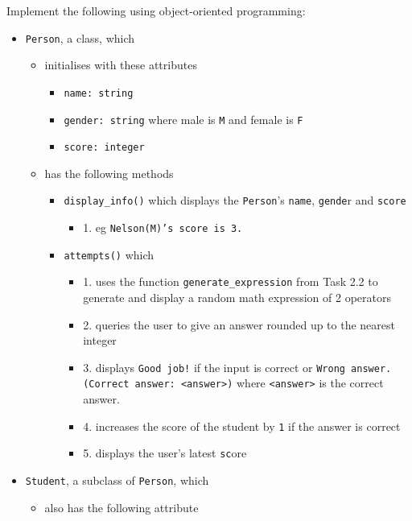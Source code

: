 Implement the following using object-oriented programming: 
\begin{itemize}
\item \texttt{Person}, a class, which 
\begin{itemize}
\item initialises with these attributes 
\begin{itemize}
\item \texttt{name: string }
\item \texttt{gender: string} where male is \textquotedbl\texttt{M}\textquotedbl{}
and female is \textquotedbl\texttt{F}\textquotedbl{} 
\item \texttt{score: integer }
\end{itemize}
\item has the following methods 
\begin{itemize}
\item \texttt{display\_info()} which displays the \texttt{Person}\textquoteright s
\texttt{name}, \texttt{gende}r and \texttt{score} 
\begin{itemize}
\item 1. eg \textquotedbl\texttt{Nelson(M)\textquoteright s score is 3.}\textquotedbl{} 
\end{itemize}
\item \texttt{attempts()} which
\begin{itemize}
\item 1. uses the function \texttt{generate\_expression} from Task 2.2 to
generate and display a random math expression of 2 operators 
\item 2. queries the user to give an answer rounded up to the nearest integer 
\item 3. displays \textquotedbl\texttt{Good job!}\textquotedbl{} if the
input is correct or \textquotedbl\texttt{Wrong answer. (Correct
answer: <answer>)}\textquotedbl{} where \texttt{<answer>} is the correct
answer. 
\item 4. increases the score of the student by \texttt{1} if the answer
is correct 
\item 5. displays the user\textquoteright s latest \texttt{sc}ore 
\end{itemize}
\end{itemize}
\end{itemize}
\item \texttt{Student}, a subclass of \texttt{Person}, which 
\begin{itemize}
\item also has the following attribute 

\end{itemize}
\end{itemize}
